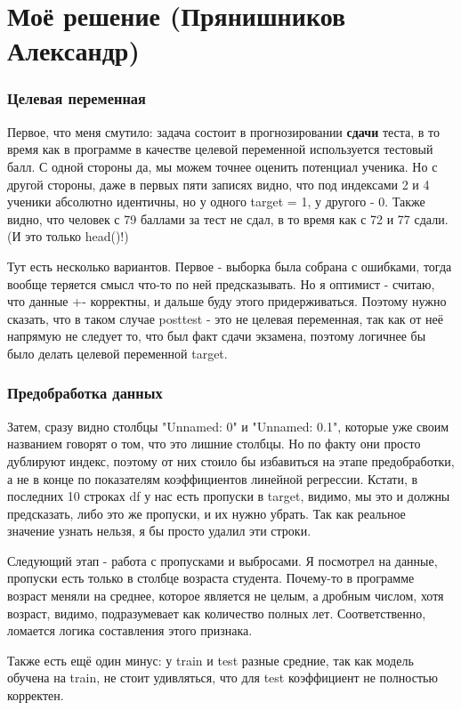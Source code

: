 \chapter*{Моё решение (Прянишников Александр)}


\subsection*{Целевая переменная}
Первое, что меня смутило: задача состоит в прогнозировании \textbf{сдачи} теста, в то время как в программе в качестве целевой переменной используется тестовый балл. 
С одной стороны да, мы можем точнее оценить потенциал ученика. 
Но с другой стороны, даже в первых пяти записях видно, что под индексами 2 и 4 ученики абсолютно идентичны, но у одного target = 1, у другого - 0. 
Также видно, что человек с 79 баллами за тест не сдал, в то время как с 72 и 77 сдали. (И это только head()!)

Тут есть несколько вариантов. 
Первое - выборка была собрана с ошибками, тогда вообще теряется смысл что-то по ней предсказывать. 
Но я оптимист - считаю, что данные +- корректны, и дальше буду этого придерживаться. 
Поэтому нужно сказать, что в таком случае posttest - это не целевая переменная, так как от неё напрямую не следует то, что был факт сдачи экзамена, поэтому логичнее бы было делать целевой переменной target.

\subsection*{Предобработка данных}
Затем, сразу видно столбцы "Unnamed: 0" и "Unnamed: 0.1", которые уже своим названием говорят о том, что это лишние столбцы. Но по факту они просто дублируют индекс, поэтому от них стоило бы избавиться на этапе предобработки, а не в конце по показателям коэффициентов линейной регрессии.
Кстати, в последних 10 строках df у нас есть пропуски в target, видимо, мы это и должны предсказать, либо это же пропуски, и их нужно убрать. Так как реальное значение узнать нельзя, я бы просто удалил эти строки.

Следующий этап - работа с пропусками и выбросами. Я посмотрел на данные, пропуски есть только в столбце возраста студента. Почему-то в программе возраст меняли на среднее, которое является не целым, а дробным числом, хотя возраст, видимо, подразумевает как количество полных лет. Соответственно, ломается логика составления этого признака. 

Также есть ещё один минус: у train и test разные средние, так как модель обучена на train, не стоит удивляться, что для test коэффициент не полностью корректен.

